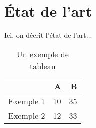 \chapter{État de l'art}

Ici, on décrit l'état de l'art...

\begin{table}[bp]
  \centering
  \begin{tabular}{rrr}
    & A & B \\
    \toprule
    Exemple 1 & 10 & 35 \\
    Exemple 2 & 12 & 33 \\
    \bottomrule
  \end{tabular}
  \caption{Un exemple de tableau}
  \label{tab:ex}
\end{table}

